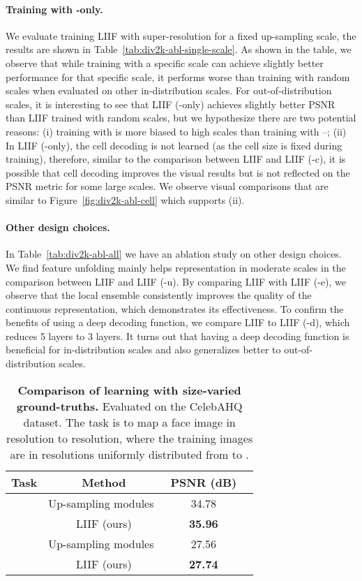 \documentclass[final]{cvpr}
\begin{document}
\paragraph{Training with -only.} We evaluate training LIIF with super-resolution for a fixed up-sampling scale, the results are shown in Table~\ref{tab:div2k-abl-single-scale}. As shown in the table, we observe that while training with a specific scale can achieve slightly better performance for that specific scale, it performs worse than training with random scales when evaluated on other in-distribution scales. For out-of-distribution scales, it is interesting to see that LIIF (-only) achieves slightly better PSNR than LIIF trained with random scales, but we hypothesize there are two potential reasons: (i) training with  is more biased to high scales than training with --; (ii) In LIIF (-only), the cell decoding is not learned (as the cell size is fixed during training), therefore, similar to the comparison between LIIF and LIIF (-c), it is possible that cell decoding improves the visual results but is not reflected on the PSNR metric for some large scales. We observe visual comparisons that are similar to Figure~\ref{fig:div2k-abl-cell} which supports (ii).

\vspace{-1em}
\paragraph{Other design choices.} In Table~\ref{tab:div2k-abl-all} we have an ablation study on other design choices. We find feature unfolding mainly helps representation in moderate scales in the comparison between LIIF and LIIF (-u). By comparing LIIF with LIIF (-e), we observe that the local ensemble consistently improves the quality of the continuous representation, which demonstrates its effectiveness. To confirm the benefits of using a deep decoding function, we compare LIIF to LIIF (-d), which reduces 5 layers to 3 layers. It turns out that having a deep decoding function is beneficial for in-distribution scales and also generalizes better to out-of-distribution scales.

\begin{table}[]
    \centering
    \begin{tabular}{c|c|cc}
        Task & Method & PSNR (dB) \\
        \hline
         & Up-sampling modules~\cite{lim2017enhanced} & 34.78 \\
         & LIIF (ours) & \textbf{35.96} \\
        \hline
         & Up-sampling modules~\cite{lim2017enhanced} & 27.56 \\
         & LIIF (ours) & \textbf{27.74} \\
    \end{tabular}
    \caption{\textbf{Comparison of learning with size-varied ground-truths.} Evaluated on the CelebAHQ dataset. The task is to map a face image in  resolution to  resolution, where the training images are in resolutions uniformly distributed from  to .}
    \label{tab:facesr}
\end{table}
\end{document}
